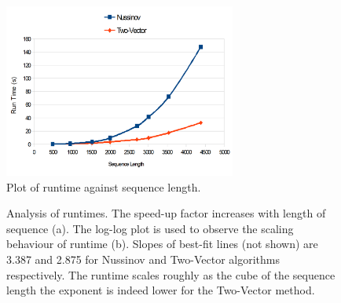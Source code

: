 \documentclass[journal]{IEEEtran}
\begin{document}
\begin{figure}[t]
\centering
\includegraphics[width=3.0in]{fig3_1}%

\caption{Plot of runtime against sequence length.}
\label{runtime}
\end{figure}

\begin{figure}[t]
\centering
{}
\hfil
{}
\caption{Analysis of runtimes. The speed-up factor increases with length of sequence (a). The log-log plot is used to observe the scaling behaviour of runtime (b). Slopes of best-fit lines (not shown) are 3.387 and 2.875 for Nussinov and Two-Vector algorithms respectively. The runtime scales roughly as the cube of the sequence length the exponent is indeed lower for the Two-Vector method. }
\label{runtime_analysis}
\end{figure}
%
\end{document}

